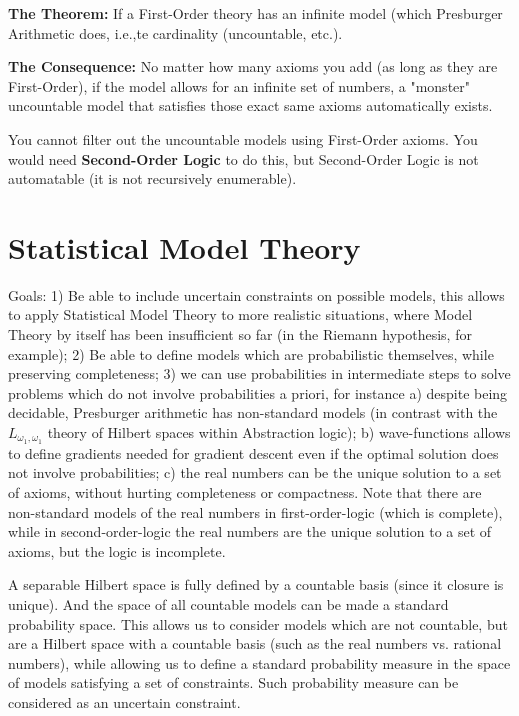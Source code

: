 \documentclass[11pt]{book}
\begin{document}
\textbf{The Theorem:} If a First-Order theory has an infinite model
(which Presburger Arithmetic does, i.e.,te cardinality (uncountable,
etc.).

\textbf{The Consequence:} No matter how many axioms you add (as long as
they are First-Order), if the model allows for an infinite set of
numbers, a "monster" uncountable model that satisfies those exact same
axioms automatically exists.

You cannot filter out the uncountable models using First-Order axioms.
You would need \textbf{Second-Order Logic} to do this, but Second-Order
Logic is not automatable (it is not recursively enumerable).

\hypertarget{statistical-model-theory}{%
\section{Statistical Model Theory}\label{statistical-model-theory}}

Goals: 1) Be able to include uncertain constraints on possible models,
this allows to apply Statistical Model Theory to more realistic
situations, where Model Theory by itself has been insufficient so far
(in the Riemann hypothesis, for example); 2) Be able to define models
which are probabilistic themselves, while preserving completeness; 3) we
can use probabilities in intermediate steps to solve problems which do
not involve probabilities a priori, for instance a) despite being
decidable, Presburger arithmetic has non-standard models (in contrast
with the \(L_{\omega_1,\omega_1}\) theory of Hilbert spaces within
Abstraction logic); b) wave-functions allows to define gradients needed
for gradient descent even if the optimal solution does not involve
probabilities; c) the real numbers can be the unique solution to a set
of axioms, without hurting completeness or compactness. Note that there
are non-standard models of the real numbers in first-order-logic (which
is complete), while in second-order-logic the real numbers are the
unique solution to a set of axioms, but the logic is incomplete.

A separable Hilbert space is fully defined by a countable basis (since
it closure is unique). And the space of all countable models can be made
a standard probability space. This allows us to consider models which
are not countable, but are a Hilbert space with a countable basis (such
as the real numbers vs. rational numbers), while allowing us to define a
standard probability measure in the space of models satisfying a set of
constraints. Such probability measure can be considered as an uncertain
constraint.
\end{document}
